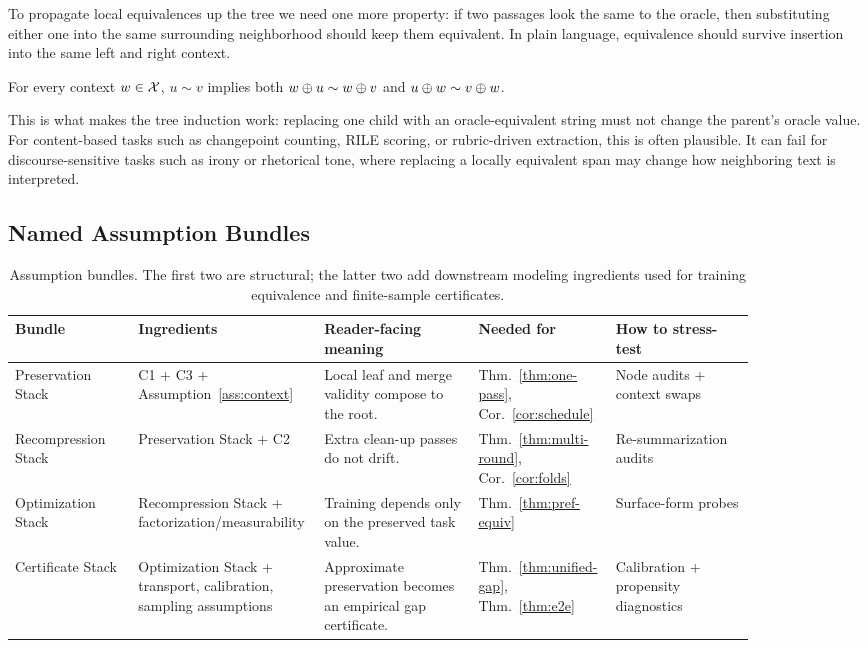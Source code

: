 To propagate local equivalences up the tree we need one more property: if two passages look the same to the oracle, then substituting either one into the same surrounding neighborhood should keep them equivalent. In plain language, equivalence should survive insertion into the same left and right context.

\begin{assumption}\label{ass:context}
For every context $w \in \mathcal{X}$, $u \sim v$ implies both $w \oplus u \sim w \oplus v$ and $u \oplus w \sim v \oplus w$.
\end{assumption}

This is what makes the tree induction work: replacing one child with an oracle-equivalent string must not change the parent's oracle value. For content-based tasks such as changepoint counting, RILE scoring, or rubric-driven extraction, this is often plausible. It can fail for discourse-sensitive tasks such as irony or rhetorical tone, where replacing a locally equivalent span may change how neighboring text is interpreted.

\subsection{Named Assumption Bundles}

\begin{table}[t]
\centering\footnotesize
\setlength{\tabcolsep}{3pt}
\begin{tabular}{p{0.16\linewidth}p{0.18\linewidth}p{0.20\linewidth}p{0.14\linewidth}p{0.18\linewidth}}
\toprule
Bundle & Ingredients & Reader-facing meaning & Needed for & How to stress-test \\
\midrule
Preservation Stack & C1 + C3 + Assumption~\ref{ass:context} & Local leaf and merge validity compose to the root. & Thm.~\ref{thm:one-pass}, Cor.~\ref{cor:schedule} & Node audits + context swaps \\
Recompression Stack & Preservation Stack + C2 & Extra clean-up passes do not drift. & Thm.~\ref{thm:multi-round}, Cor.~\ref{cor:folds} & Re-summarization audits \\
Optimization Stack & Recompression Stack + factorization/measurability & Training depends only on the preserved task value. & Thm.~\ref{thm:pref-equiv} & Surface-form probes \\
Certificate Stack & Optimization Stack + transport, calibration, sampling assumptions & Approximate preservation becomes an empirical gap certificate. & Thm.~\ref{thm:unified-gap}, Thm.~\ref{thm:e2e} & Calibration + propensity diagnostics \\
\bottomrule
\end{tabular}
\caption{Assumption bundles. The first two are structural; the latter two add downstream modeling ingredients used for training equivalence and finite-sample certificates.}
\label{tab:assumption-bundles}
\end{table}

